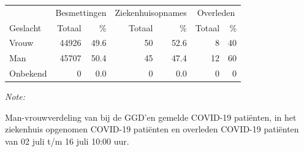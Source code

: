 \documentclass[
  english,
  man,floatsintext]{apa6}
\begin{document}
\begin{table}
\centering\begingroup\fontsize{11}{13}\selectfont

\begin{threeparttable}
\begin{tabular}{lrrrrrr}
\toprule
\multicolumn{1}{c}{ } & \multicolumn{2}{c}{Besmettingen} & \multicolumn{2}{c}{Ziekenhuisopnames} & \multicolumn{2}{c}{Overleden} \\
\cmidrule(l{3pt}r{3pt}){2-3} \cmidrule(l{3pt}r{3pt}){4-5} \cmidrule(l{3pt}r{3pt}){6-7}
Geslacht & Totaal & \% & Totaal & \% & Totaal & \%\\
\midrule
Vrouw & 44926 & 49.6 & 50 & 52.6 & 8 & 40\\
Man & 45707 & 50.4 & 45 & 47.4 & 12 & 60\\
Onbekend & 0 & 0.0 & 0 & 0.0 & 0 & 0\\
\bottomrule
\end{tabular}
\begin{tablenotes}
\item \textit{Note: } 
\item Man-vrouwverdeling van bij de GGD’en gemelde COVID-19 patiënten, in het ziekenhuis opgenomen COVID-19 patiënten en overleden COVID-19 patiënten van 02 juli t/m 16 juli 10:00 uur.
\end{tablenotes}
\end{threeparttable}
\endgroup{}
\end{table}
\newpage
\end{document}
